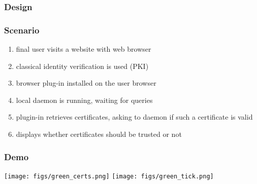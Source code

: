 \begin{frame}
	\frametitle{Design}
	\begin{center}
	\end{center}
\end{frame}

\begin{frame}
	\frametitle{Scenario}
	\begin{alertblock}{}
		\begin{enumerate}
			\item final user visits a website with web browser
			\item classical identity verification is used (PKI)
			\item browser plug-in installed on the user browser
			\item local daemon is running, waiting for queries
			\item plugin-in retrieves certificates, asking to daemon if such a certificate is valid
			\item displays whether certificates should be trusted or not
		\end{enumerate}
	\end{alertblock}
\end{frame}


\begin{frame}
	\frametitle{Demo}
	\begin{center}
		\texttt{[image: figs/green\_certs.png]}
		\texttt{[image: figs/green\_tick.png]}
	\end{center}
\end{frame}

